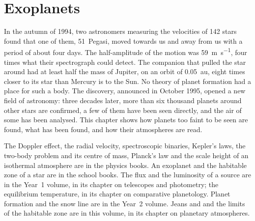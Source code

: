 \chapter{Exoplanets}\label{ch:b3:exoplanets}

In the autumn of 1994, two astronomers measuring the velocities of 142
stars found that one of them, 51~Pegasi, moved towards us and away from
us with a period of about four days. The half-amplitude of the motion was
\qty{59}{m.s^{-1}}, four times what their spectrograph could detect. The
companion that pulled the star around had at least half the mass of
Jupiter, on an orbit of \qty{0.05}{au}, eight times closer to its star
than Mercury is to the Sun. No theory of planet formation had a place for
such a body. The discovery, announced in October 1995, opened a new field
of astronomy: three decades later, more than six thousand planets around
other stars are confirmed, a few of them have been seen directly, and the
air of some has been analysed. This chapter shows how planets too faint
to be seen are found, what has been found, and how their atmospheres are
read.

\begin{recall}
The Doppler effect, the radial velocity, spectroscopic binaries, Kepler's
laws, the two-body problem and its centre of mass, Planck's law and the
scale height of an isothermal atmosphere are in the physics books. An
exoplanet and the habitable zone of a star are in the school books. The
flux and the luminosity of a source are in the Year~1 volume, in its
chapter on telescopes and photometry; the equilibrium temperature, in its
chapter on comparative planetology. Planet formation and the snow line
are in the Year~2 volume. Jeans and  and the limits of
the habitable zone are in this volume, in its chapter on planetary
atmospheres.
\end{recall}

